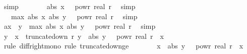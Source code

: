 \begin{isabellebody}
\ simp\isanewline
\ \ \isamarkupfalse%
\ \isamarkupfalse%
\ {\isachardoublequoteopen}{\isachardot}{\kern0pt}{\isachardot}{\kern0pt}{\isachardot}{\kern0pt}\ {\isasymle}\ abs\ x\ {\isacharasterisk}{\kern0pt}\ {}\ powr\ {\isacharparenleft}{\kern0pt}{\isacharminus}{\kern0pt}real\ r{\isacharparenright}{\kern0pt}{\isachardoublequoteclose}\ \isamarkupfalse%
\ simp\isanewline
\ \ \isamarkupfalse%
\ \isamarkupfalse%
\ {\isachardoublequoteopen}{\isachardot}{\kern0pt}{\isachardot}{\kern0pt}{\isachardot}{\kern0pt}\ {\isasymle}\ max\ {\isacharparenleft}{\kern0pt}abs\ x{\isacharparenright}{\kern0pt}\ {\isacharparenleft}{\kern0pt}abs\ y{\isacharparenright}{\kern0pt}\ {\isacharasterisk}{\kern0pt}\ {}\ powr\ {\isacharparenleft}{\kern0pt}{\isacharminus}{\kern0pt}real\ r{\isacharparenright}{\kern0pt}{\isachardoublequoteclose}\ \isamarkupfalse%
\ simp\isanewline
\ \ \isamarkupfalse%
\ \isamarkupfalse%
\ a{\isacharcolon}{\kern0pt}{\isachardoublequoteopen}x\ {\isacharminus}{\kern0pt}\ y\ {\isasymle}\ max\ {\isacharparenleft}{\kern0pt}abs\ x{\isacharparenright}{\kern0pt}\ {\isacharparenleft}{\kern0pt}abs\ y{\isacharparenright}{\kern0pt}\ {\isacharasterisk}{\kern0pt}\ {}\ powr\ {\isacharparenleft}{\kern0pt}{\isacharminus}{\kern0pt}real\ r{\isacharparenright}{\kern0pt}{\isachardoublequoteclose}\ \isamarkupfalse%
\ simp\isanewline
\isanewline
\ \ \isamarkupfalse%
\ {\isachardoublequoteopen}y\ {\isacharminus}{\kern0pt}\ x\ {\isasymle}\ truncate{\isacharunderscore}{\kern0pt}down\ r\ y\ {\isacharplus}{\kern0pt}\ abs\ y\ {\isacharasterisk}{\kern0pt}\ {}\ powr\ {\isacharparenleft}{\kern0pt}{\isacharminus}{\kern0pt}real\ r{\isacharparenright}{\kern0pt}\ {\isacharminus}{\kern0pt}\ x{\isachardoublequoteclose}\isanewline
\ \ \ \ \isamarkupfalse%
\ {\isacharparenleft}{\kern0pt}rule\ diff{\isacharunderscore}{\kern0pt}right{\isacharunderscore}{\kern0pt}mono{\isacharcomma}{\kern0pt}\ rule\ truncate{\isacharunderscore}{\kern0pt}down{\isacharunderscore}{\kern0pt}ge{\isacharparenright}{\kern0pt}\isanewline
\ \ \isamarkupfalse%
\ \isamarkupfalse%
\ {\isachardoublequoteopen}{\isachardot}{\kern0pt}{\isachardot}{\kern0pt}{\isachardot}{\kern0pt}\ {\isasymle}\ x\ {\isacharplus}{\kern0pt}\ abs\ y\ {\isacharasterisk}{\kern0pt}\ {}\ powr\ {\isacharparenleft}{\kern0pt}{\isacharminus}{\kern0pt}real\ r{\isacharparenright}{\kern0pt}\ {\isacharminus}{\kern0pt}\ x{\isachardoublequoteclose}\isanewline

\end{isabellebody}
